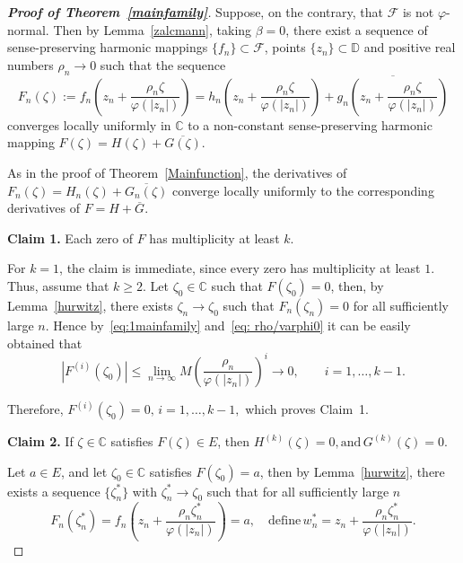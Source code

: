 \documentclass[11pt, reqno]{amsart}
\numberwithin{equation}{section}
\theoremstyle{definition}
\theoremstyle{remark}
\theoremstyle{plain}
\begin{document}
\begin{proof}[\bf{Proof of Theorem~\ref{mainfamily}}]
  Suppose, on the contrary, that $\mathcal{F}$ is not
$\varphi$-normal. Then by Lemma~\ref{zalcmann}, taking 
$\beta=0$, there exist
 a sequence of sense-preserving harmonic mappings 
 $\{f_n\} \subset \mathcal{F}$, points
$\{z_n\}\subset\mathbb{D}$ and positive real numbers
$\rho_n\to0$ such that the sequence
\begin{equation}\label{eq: zalcfamily}
F_n(\zeta)
:=
f_n\!\left(
z_n+\frac{\rho_n\zeta}{\varphi(|z_n|)}
\right)
=
h_n\!\left(
z_n+\frac{\rho_n\zeta}{\varphi(|z_n|)}
\right)
+
\overline{
g_n\!\left(
z_n+\frac{\rho_n\zeta}{\varphi(|z_n|)}
\right)
}
\end{equation}
converges locally uniformly in $\mathbb{C}$ to 
a non-constant
 sense-preserving harmonic mapping $
 F(\zeta)=H(\zeta)+\overline{G(\zeta)}.
$\smallskip

As in the proof of Theorem~\ref{Mainfunction}, the derivatives
of $F_n(\zeta)=H_n(\zeta)+\overline{G_n(\zeta)}$ converge locally 
uniformly to the corresponding 
derivatives of $F=H+\overline{G}$.

\noindent \textbf{Claim 1.}
Each zero of $F$ has multiplicity at least $k$.\smallskip

For $k=1$, the claim is immediate, since every zero has multiplicity at least $1$. Thus, assume that $k\ge2$.
Let $\zeta_0\in\mathbb C$ such that $F(\zeta_0)=0$,
then, by Lemma~\ref{hurwitz},  there exists
$\zeta_n\to\zeta_0$ such that $F_n(\zeta_n)=0$ for all sufficiently large $n$. 
Hence by~\eqref{eq:1mainfamily} and~\eqref{eq: rho/varphi0} it can be easily
obtained that
\[
|F^{(i)}(\zeta_0)|
\le
\lim_{n\to\infty}
M
\left(
\frac{\rho_n}{\varphi(|z_n|)}
\right)^i
\longrightarrow 0,
\qquad
i=1,\ldots,k-1.
\]

Therefore,
$
F^{(i)}(\zeta_0)=0,
\,
i=1,\ldots,k-1,
$
which proves Claim~1.\smallskip

\noindent
\textbf{Claim 2.}
If $\zeta \in \mathbb{C}$ satisfies $F(\zeta)\in E$, then
$
H^{(k)}(\zeta)=0, \text{and}\, 
G^{(k)}(\zeta)=0.
$\smallskip

Let $a\in E$, and let $\zeta_{0}\in \mathbb{C}$ satisfies
$
F(\zeta_{0})=a
$, then
by Lemma~\ref{hurwitz}, there exists a 
sequence $\{\zeta_n^*\}$ with
$\zeta_n^*\to\zeta_0$ such that for all sufficiently large $n$
\[
F_n(\zeta_n^*)
=
f_n\!\left(
z_n+\frac{\rho_n\zeta_n^*}{\varphi(|z_n|)}
\right)
=a, \quad \text{define} \, w_n^*
=
z_n+\frac{\rho_n\zeta_n^*}{\varphi(|z_n|)}.
\]


\end{proof}
\end{document}
